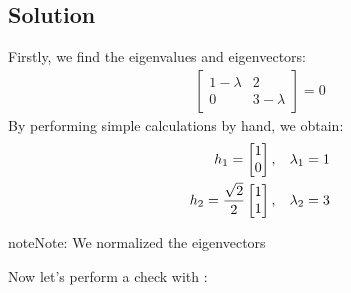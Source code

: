 \documentclass[letterpaper,10pt,english]{jupyterBook}
\begin{document}
\subsection{Solution}
\label{\detokenize{notebooks/ProblemSet2:id1}}
\sphinxAtStartPar
Firstly, we find the eigenvalues and eigenvectors:
\begin{equation*}
\begin{split}
\begin{bmatrix}
1-\lambda & 2\\
0 & 3-\lambda
\end{bmatrix}
 = 0
\end{split}
\end{equation*}
\sphinxAtStartPar
By performing simple calculations by hand, we obtain:
\begin{equation*}
\begin{split}
h_1 = 
\begin{bmatrix}
1\\
0
\end{bmatrix}
,\hspace{3mm}
\lambda_1 = 1
\\
h_2 =
\frac{\sqrt{2}}{2}
\begin{bmatrix}
1\\
1
\end{bmatrix}
,\hspace{3mm}
\lambda_2 = 3
\end{split}
\end{equation*}
\begin{sphinxadmonition}{note}{Note:}
\sphinxAtStartPar
We normalized the eigenvectors
\end{sphinxadmonition}

\sphinxAtStartPar
Now let’s perform a check with :

\begin{sphinxVerbatim}[commandchars=\\\{\}]
  \PYG{p}{[}
    \PYG{p}{[} \PYG{p}{]}
    \PYG{p}{[} \PYG{p}{]}
\PYG{p}{]}

   
\end{sphinxVerbatim}
\end{document}
